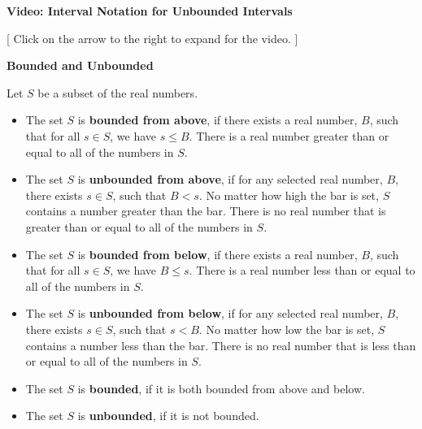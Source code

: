\documentclass{ximera}
\begin{document}
\begin{explanation} \textbf{Video: Interval Notation for Unbounded Intervals}

[ Click on the arrow to the right to expand for the video. ]
\begin{expandable} 

\begin{center}
\end{center}

\end{expandable}
\end{explanation}










\begin{definition} \item \textbf{\textcolor{green!50!black}{Bounded and Unbounded}}

Let $S$ be a subset of the real numbers. \\


\begin{itemize}
\item The set $S$ is \textbf{bounded from above}, if there exists a real number, $B$, such that for all $s \in S$, we have $s \leq B$.  There is a real number greater than or equal to all of the numbers in $S$.  \\

\item The set $S$ is \textbf{unbounded from above}, if for any selected real number, $B$, there exists $s \in S$, such that $B < s$. No matter how high the bar is set, $S$ contains a number greater than the bar.  There is no real number that is greater than or equal to all of the numbers in $S$. \\

\item The set $S$ is \textbf{bounded from below}, if there exists a real number, $B$, such that for all $s \in S$, we have $B \leq s$.  There is a real number less than or equal to all of the numbers in $S$.  \\

\item The set $S$ is \textbf{unbounded from below}, if for any selected real number, $B$, there exists $s \in S$, such that $s < B$. No matter how low the bar is set, $S$ contains a number less than the bar.  There is no real number that is less than or equal to all of the numbers in $S$.  \\

\item The set $S$ is \textbf{bounded}, if it is both bounded from above and below.  

\item The set $S$ is \textbf{unbounded}, if it is not bounded.  \\
\end{itemize}


\end{definition}
\end{document}
